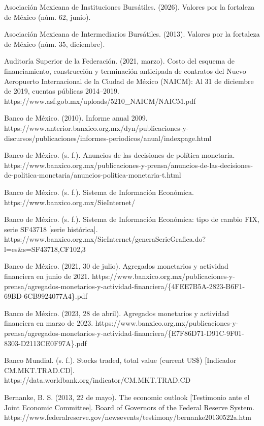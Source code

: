 \begin{referencias}

Asociación Mexicana de Instituciones Bursátiles. (2026). Valores por la fortaleza de México (núm. 62, junio).

Asociación Mexicana de Intermediarios Bursátiles. (2013). Valores por la fortaleza de México (núm. 35, diciembre).

Auditoría Superior de la Federación. (2021, marzo). Costo del esquema de financiamiento, construcción y terminación anticipada de contratos del Nuevo Aeropuerto Internacional de la Ciudad de México (NAICM): Al 31 de diciembre de 2019, cuentas públicas 2014--2019. https://www.asf.gob.mx/uploads/5210\_NAICM/NAICM.pdf

Banco de México. (2010). Informe anual 2009. https://www.anterior.banxico.org.mx/dyn/publicaciones-y-discursos/publicaciones/informes-periodicos/anual/indexpage.html

Banco de México. (s. f.). Anuncios de las decisiones de política monetaria. https://www.banxico.org.mx/publicaciones-y-prensa/anuncios-de-las-decisiones-de-politica-monetaria/anuncios-politica-monetaria-t.html

Banco de México. (s. f.). Sistema de Información Económica. https://www.banxico.org.mx/SieInternet/

Banco de México. (s. f.). Sistema de Información Económica: tipo de cambio FIX, serie SF43718 {[}serie histórica{]}. https://www.banxico.org.mx/SieInternet/generaSerieGrafica.do?l=es\&s=SF43718,CF102,3

Banco de México. (2021, 30 de julio). Agregados monetarios y actividad financiera en junio de 2021. https://www.banxico.org.mx/publicaciones-y-prensa/agregados-monetarios-y-actividad-financiera/\{4FEE7B5A-2823-B6F1-69BD-6CB9924077A4\}.pdf

Banco de México. (2023, 28 de abril). Agregados monetarios y actividad financiera en marzo de 2023. https://www.banxico.org.mx/publicaciones-y-prensa/agregados-monetarios-y-actividad-financiera/\{E7F86D71-D91C-9F01-8303-D2113CE0F97A\}.pdf

Banco Mundial. (s. f.). Stocks traded, total value (current US\$) {[}Indicador CM.MKT.TRAD.CD{]}. https://data.worldbank.org/indicator/CM.MKT.TRAD.CD

Bernanke, B. S. (2013, 22 de mayo). The economic outlook {[}Testimonio ante el Joint Economic Committee{]}. Board of Governors of the Federal Reserve System. https://www.federalreserve.gov/newsevents/testimony/bernanke20130522a.htm


\end{referencias}
